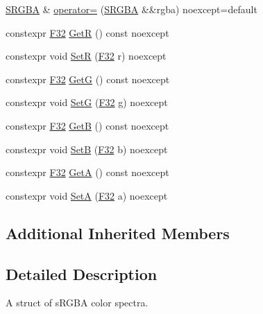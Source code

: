 \begin{DoxyCompactItemize}
\item 
\mbox{\hyperlink{structmage_1_1_s_r_g_b_a}{S\+R\+G\+BA}} \& \mbox{\hyperlink{structmage_1_1_s_r_g_b_a_a0f7080a5fc080f5e3463ca95bb21918c}{operator=}} (\mbox{\hyperlink{structmage_1_1_s_r_g_b_a}{S\+R\+G\+BA}} \&\&rgba) noexcept=default
\item 
constexpr \mbox{\hyperlink{namespacemage_aa97e833b45f06d60a0a9c4fc22ae02c0}{F32}} \mbox{\hyperlink{structmage_1_1_s_r_g_b_a_a7f88a4619ba00d7a8d8b33e5f07b3b81}{GetR}} () const noexcept
\item 
constexpr void \mbox{\hyperlink{structmage_1_1_s_r_g_b_a_a5716004c31803848e5a0b50fee5bee55}{SetR}} (\mbox{\hyperlink{namespacemage_aa97e833b45f06d60a0a9c4fc22ae02c0}{F32}} r) noexcept
\item 
constexpr \mbox{\hyperlink{namespacemage_aa97e833b45f06d60a0a9c4fc22ae02c0}{F32}} \mbox{\hyperlink{structmage_1_1_s_r_g_b_a_a5603f67bb32b82a28758dbf26eddc8fd}{GetG}} () const noexcept
\item 
constexpr void \mbox{\hyperlink{structmage_1_1_s_r_g_b_a_a654633df97da325ed0b838e80c6c243e}{SetG}} (\mbox{\hyperlink{namespacemage_aa97e833b45f06d60a0a9c4fc22ae02c0}{F32}} g) noexcept
\item 
constexpr \mbox{\hyperlink{namespacemage_aa97e833b45f06d60a0a9c4fc22ae02c0}{F32}} \mbox{\hyperlink{structmage_1_1_s_r_g_b_a_a5797da9eb025eab2d7e8b3331a8fd312}{GetB}} () const noexcept
\item 
constexpr void \mbox{\hyperlink{structmage_1_1_s_r_g_b_a_ae3cd3242e9b75444d8e6ae6bd9098b58}{SetB}} (\mbox{\hyperlink{namespacemage_aa97e833b45f06d60a0a9c4fc22ae02c0}{F32}} b) noexcept
\item 
constexpr \mbox{\hyperlink{namespacemage_aa97e833b45f06d60a0a9c4fc22ae02c0}{F32}} \mbox{\hyperlink{structmage_1_1_s_r_g_b_a_a90ab59ec00e8e710a1d679cb0277373f}{GetA}} () const noexcept
\item 
constexpr void \mbox{\hyperlink{structmage_1_1_s_r_g_b_a_a42ec1125cb5f2ccc4520b6f0c195ae59}{SetA}} (\mbox{\hyperlink{namespacemage_aa97e833b45f06d60a0a9c4fc22ae02c0}{F32}} a) noexcept
\end{DoxyCompactItemize}
\subsection*{Additional Inherited Members}


\subsection{Detailed Description}
A struct of s\+R\+G\+BA color spectra. 

